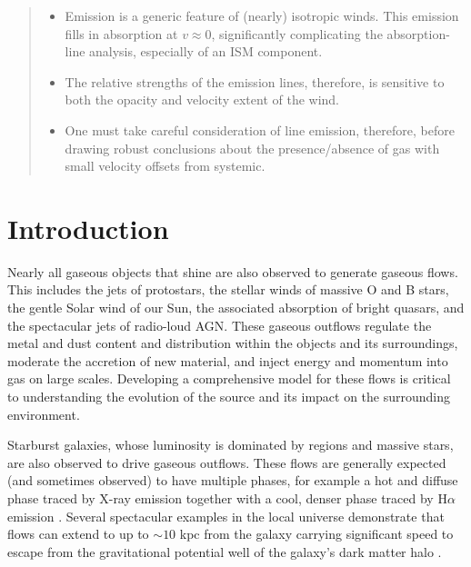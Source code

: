 \documentclass[12pt,preprint]{aastex}
\begin{document}
\begin{abstract}
\begin{itemize}
\item Emission is a generic feature of (nearly) isotropic winds.  This
  emission fills in absorption at $v \approx 0$, significantly
  complicating the absorption-line analysis, especially of an ISM
  component. 
\item The relative strengths of the emission
lines, therefore, is sensitive to both the opacity and velocity
extent of the wind.
\item  One must take careful
consideration of line emission, therefore,  before drawing robust
conclusions about the presence/absence of gas with small velocity
offsets from systemic. 
\end{itemize}
\end{abstract}


\section{Introduction}
\label{sec:intro}

Nearly all gaseous objects that shine are also
observed to generate gaseous flows.  This includes the jets of protostars, the
stellar winds of massive O and B stars, the gentle Solar wind
of our Sun, the associated absorption of bright quasars, and the
spectacular jets of radio-loud AGN.   These gaseous outflows 
regulate the metal and dust content and distribution within the 
objects and its surroundings, 
moderate the accretion of new material, and %
inject energy and momentum into gas on large scales. %
Developing a comprehensive model for these flows is critical to
understanding the evolution of the source and its impact on the
surrounding environment.

Starburst galaxies, whose luminosity is dominated by  regions
and massive stars, are also observed to drive gaseous outflows.  These
flows are generally expected (and sometimes observed) to have multiple
phases, for example a hot and diffuse phase traced by X-ray emission
together with a cool, denser phase traced by H$\alpha$ emission 
\citep[e.g.][]{ham90,martin99,shc+04,km10}. 
Several spectacular
examples in the local universe demonstrate that flows can extend to
up to $\sim 10$ kpc
from the galaxy \citep{lhw99,wsg08,vsr+03} carrying significant speed
to escape from the gravitational potential well of the galaxy's dark
matter halo \citep[e.g.][]{sh09}.
\end{document}
